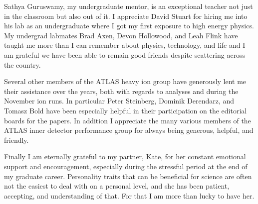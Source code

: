 Sathya Guruswamy, my undergraduate mentor, is an exceptional teacher not just in the classroom but also out of it.
I appreciate David Stuart for hiring me into his lab as an undergraduate where I got my first exposure to high energy physics.
My undergrad labmates Brad Axen, Devon Hollowood, and Leah Flink have taught me more than I can remember about physics, technology, and life and I am grateful we have been able to remain good friends despite scattering across the country.

Several other members of the ATLAS heavy ion group have generously lent me their assistance over the years, both with regards to analyses and during the November ion runs.
In particular Peter Steinberg, Dominik Derendarz, and Tomasz Bold have been especially helpful in their participation on the editorial boards for the papers.
In addition I appreciate the many various members of the ATLAS inner detector performance group for always being generous, helpful, and friendly.

Finally I am eternally grateful to my partner, Kate, for her constant emotional support and encouragement, especially during the stressful period at the end of my graduate career.
Personality traits that can be beneficial for science are often not the easiest to deal with on a personal level, and she has been patient, accepting, and understanding of that.
For that I am more than lucky to have her.

